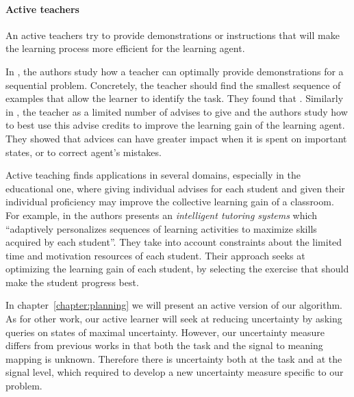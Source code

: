 

\paragraph{Active teachers}

An active teachers try to provide demonstrations or instructions that will make the learning process more efficient for the learning agent. 

In \cite{cakmak2012algorithmic}, the authors study how a teacher can optimally provide demonstrations for a sequential problem. Concretely, the teacher should find the smallest sequence of examples that allow the learner to identify the task. They found that . Similarly in \cite{torrey2013teaching}, the teacher as a limited number of advises to give and the authors study how to best use this advise credits to improve the learning gain of the learning agent. They showed that advices can have greater impact when it is spent on important states, or to correct agent's mistakes.

Active teaching finds applications in several domains, especially in the educational one, where giving individual advises for each student and given their individual proficiency may improve the collective learning gain of a classroom. For example, in \cite{clement2014online} the authors presents an \emph{intelligent tutoring systems} which ``adaptively personalizes sequences of learning activities to maximize skills acquired by each student''. They take into account constraints about the limited time and motivation resources of each student. Their approach seeks at optimizing the learning gain of each student, by selecting the exercise that should make the student progress best.
 
\transition

In chapter~\ref{chapter:planning} we will present an active version of our algorithm. As for other work, our active learner will seek at reducing uncertainty by asking queries on states of maximal uncertainty. However, our uncertainty measure differs from previous works in that both the task and the signal to meaning mapping is unknown. Therefore there is uncertainty both at the task and at the signal level, which required to develop a new uncertainty measure specific to our problem.

